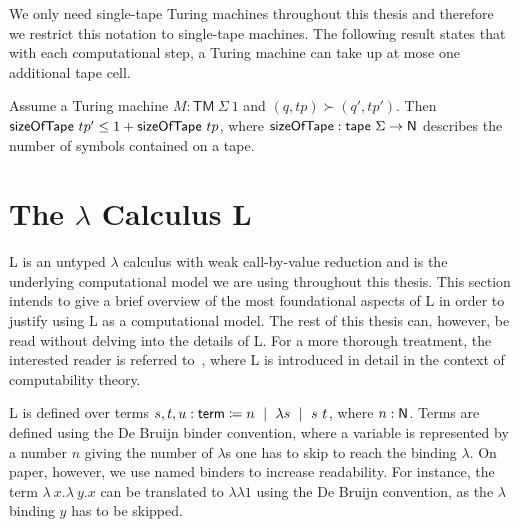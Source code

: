 We only need single-tape Turing machines throughout this thesis and therefore we restrict this notation to single-tape machines.
The following result states that with each computational step, a Turing machine can take up at mose one additional tape cell. 
\begin{lemma}
  Assume a Turing machine $M : \textsf{TM}~\Sigma~1$ and $(q, tp) \succ (q', tp')$. Then $\textsf{sizeOfTape}~tp' \le 1 +{\textsf{sizeOfTape}~tp}$, 
  where $\textsf{sizeOfTape} : \textsf{tape}~\Sigma \rightarrow \mathsf{N}$ describes the number of symbols contained on a tape.
\end{lemma}

\newcommand{\Lterm}{\textsf{term}}
\section{The $\lambda$ Calculus L}
L is an untyped $\lambda$ calculus with weak call-by-value reduction and is the underlying computational model we are using throughout this thesis. 
This section intends to give a brief overview of the most foundational aspects of L in order to justify using L as a computational model. The rest of this thesis can, however, be read without delving into the details of L. 
For a more thorough treatment, the interested reader is referred to~\cite{ForsterSmolka:2017:L-Computability}, where L is introduced in detail in the context of computability theory.

L is defined over terms $s, t, u: \Lterm \defeq n \bnfmid \lambda s \bnfmid s~t$, where $n : \mathsf{N}$. Terms are defined using the De Bruijn binder convention, where a variable is represented by a number $n$ giving the number of $\lambda$s one has to skip to reach the binding $\lambda$. On paper, however, we use named binders to increase readability. For instance, the term $\lambda~x. \lambda~y. x$ can be translated to $\lambda\lambda 1$ using the De Bruijn convention, as the $\lambda$ binding $y$ has to be skipped. 

